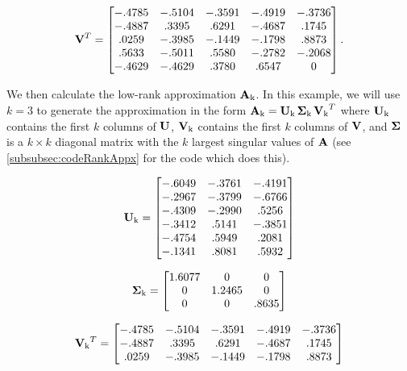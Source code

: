 \begin{equation}\label{eq:matVtPreRankReduce}
    \operatorname{\mathbf{V}}^T=
    \begin{bmatrix}
    -.4785 & -.5104 & -.3591 & -.4919 & -.3736 \\
    -.4887 & .3395 & .6291 & -.4687 & .1745 \\
    .0259 & -.3985 & -.1449 & -.1798 & .8873 \\
    .5633 & -.5011 & .5580 & -.2782 & -.2068 \\
    -.4629 & -.4629 & .3780 & .6547 & 0 \\
    \end{bmatrix}.
\end{equation}

We then calculate the low-rank approximation $\operatorname{\mathbf{A}_k}$. In this example, we will use $k=3$ to generate the approximation in the form $\operatorname{\mathbf{A}_k} = \operatorname{\mathbf{U}_k} \operatorname{\mathbf{\Sigma}_k} \operatorname{\mathbf{V}_k}^T$ where $\operatorname{\mathbf{U}_k}$ contains the first $k$ columns of $\operatorname{\mathbf{U}}$, $\operatorname{\mathbf{V}_k}$ contains the first $k$ columns of $\operatorname{\mathbf{V}}$, and $\operatorname{\mathbf{\Sigma}}$ is a $k\times k$ diagonal matrix with the $k$ largest singular values of $\operatorname{\mathbf{A}}$ (see \autoref{subsubsec:codeRankAppx} for the code which does this).

\begin{equation}\label{eq:matU}
\operatorname{\mathbf{U}_k}=
\begin{bmatrix}
-.6049 & -.3761 & -.4191 \\
-.2967 & -.3799 & -.6766 \\
-.4309 & -.2990 & .5256 \\
-.3412 & .5141 & -.3851 \\
-.4754 & .5949 & .2081 \\
-.1341 & .8081 & .5932 \\
\end{bmatrix}
\end{equation}

\begin{equation}\label{eq:matD}
\operatorname{\mathbf{\Sigma}_k}=
    \begin{bmatrix}
    1.6077 & 0 & 0 \\
    0 & 1.2465 & 0  \\
    0 & 0 & .8635 \\
    \end{bmatrix}
\end{equation}

\begin{equation}\label{eq:matVt}
\operatorname{\mathbf{V}_k}^T=
    \begin{bmatrix}
     -.4785 & -.5104 & -.3591 & -.4919 & -.3736 \\
     -.4887 & .3395 & .6291 & -.4687 & .1745 \\
     .0259 & -.3985 & -.1449 & -.1798 & .8873 \\
    \end{bmatrix}
\end{equation}

